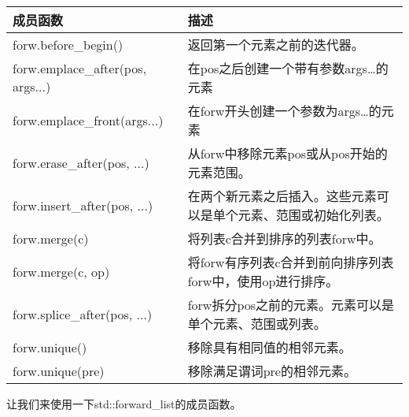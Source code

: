 \begin{longtable}[c]{|l|l|}
\hline
\textbf{成员函数}         & \textbf{描述}                                                                           \\ \hline
\endfirsthead
%
\endhead
%
forw.before\_begin()              & 返回第一个元素之前的迭代器。                                                  \\ \hline
forw.emplace\_after(pos, args...) & 在pos之后创建一个带有参数args…的元素                                        \\ \hline
forw.emplace\_front(args...)      & 在forw开头创建一个参数为args…的元素                         \\ \hline
forw.erase\_after(pos, ...)       & 从forw中移除元素pos或从pos开始的元素范围。                   \\ \hline
forw.insert\_after(pos, ...) & 在两个新元素之后插入。这些元素可以是单个元素、范围或初始化列表。                        \\ \hline
forw.merge(c)                     & 将列表c合并到排序的列表forw中。 \\ \hline
forw.merge(c, op)            & 将forw有序列表c合并到前向排序列表forw中，使用op进行排序。 \\ \hline
forw.splice\_after(pos, ...) & forw拆分pos之前的元素。元素可以是单个元素、范围或列表。                               \\ \hline
forw.unique()                     & 移除具有相同值的相邻元素。                                                 \\ \hline
forw.unique(pre)                  & 移除满足谓词pre的相邻元素。                                       \\ \hline
\end{longtable}

让我们来使用一下std::forward\_list的成员函数。


